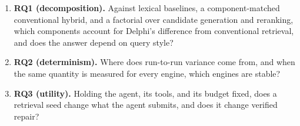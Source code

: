\documentclass{article}
\newcommand{\system}{Delphi}
\begin{document}
\begin{enumerate}
    \item \textbf{RQ1 (decomposition).} Against lexical baselines, a component-matched conventional hybrid, and a factorial over candidate generation and reranking, which components account for \system{}'s difference from conventional retrieval, and does the answer depend on query style?
    \item \textbf{RQ2 (determinism).} Where does run-to-run variance come from, and when the same quantity is measured for every engine, which engines are stable?
    \item \textbf{RQ3 (utility).} Holding the agent, its tools, and its budget fixed, does a retrieval seed change what the agent submits, and does it change verified repair?
\end{enumerate}
\end{document}
